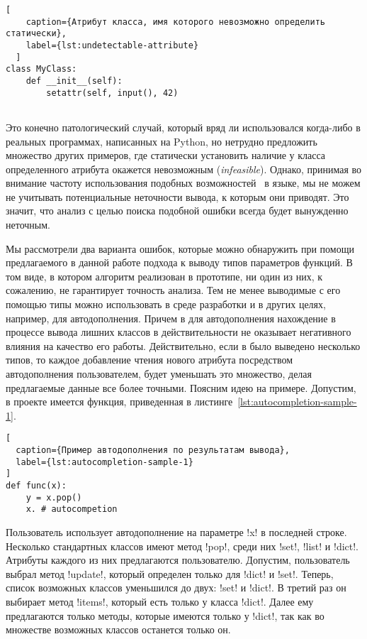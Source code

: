 \begin{description}
  \begin{lstlisting}[
    caption={Атрибут класса, имя которого невозможно определить статически},
    label={lst:undetectable-attribute}
  ]
class MyClass:
    def __init__(self):
        setattr(self, input(), 42)
      
  \end{lstlisting} Это конечно патологический случай, который вряд ли
  использовался когда-либо в реальных программах, написанных на Python, но
  нетрудно предложить множество других примеров, где статически установить
  наличие у класса определенного атрибута окажется невозможным
  (\emph{infeasible}).  Однако, принимая во внимание частоту использования
  подобных возможностей~\cite{Holkner2009} в языке, мы не можем не учитывать
  потенциальные неточности вывода, к которым они приводят. Это значит, что
  анализ с целью поиска подобной ошибки всегда будет вынужденно неточным.

\end{description}

Мы рассмотрели два варианта ошибок, которые можно обнаружить при помощи
предлагаемого в данной работе подхода к выводу типов параметров функций.  В том
виде, в котором алгоритм реализован в прототипе, ни один из них, к сожалению, не
гарантирует точность анализа. Тем не менее выводимые с его помощью типы можно
использовать в среде разработки и в других целях, например, для автодополнения.
Причем в для автодополнения нахождение в процессе вывода лишних классов в
действительности не оказывает негативного влияния на качество его работы.
Действительно, если в было выведено несколько типов, то каждое
добавление чтения нового атрибута посредством автодополнения пользователем,
будет уменьшать это множество, делая предлагаемые данные все более точными.
Поясним идею на примере. Допустим, в проекте имеется функция, приведенная в
листинге~\ref{lst:autocompletion-sample-1}. 

\begin{lstlisting}[
  caption={Пример автодополнения по результатам вывода},
  label={lst:autocompletion-sample-1}
]
def func(x):
    y = x.pop()
    x. # autocompetion
\end{lstlisting}

Пользователь использует автодополнение на параметре !x! в последней строке.
Несколько стандартных классов имеют метод !pop!, среди них !set!, !list! и
!dict!. Атрибуты каждого из них предлагаются пользователю. Допустим,
пользователь выбрал метод !update!, который определен только для !dict! и
!set!. Теперь, список возможных классов уменьшился до двух: !set! и
!dict!. В третий раз он выбирает метод !items!, который есть только у класса
!dict!.  Далее ему предлагаются только методы, которые имеются только у !dict!,
так как во множестве возможных классов останется только он.

